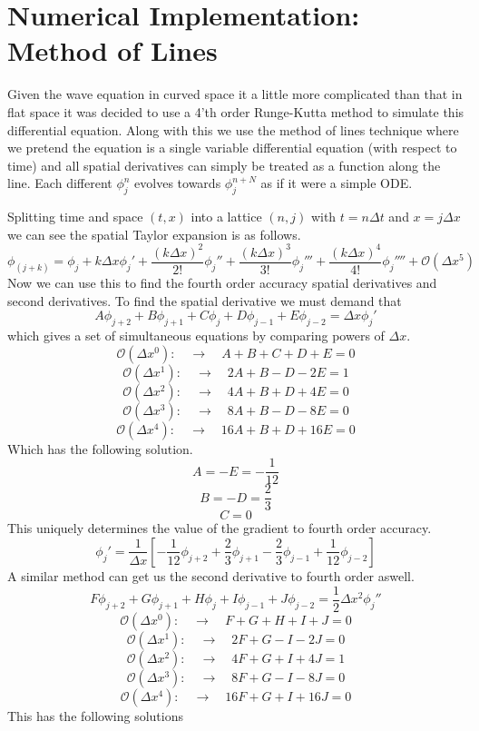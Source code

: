 \documentclass[11pt, oneside]{report}  %
\numberwithin{equation}{section}
\begin{document}
\section{Numerical Implementation: Method of Lines}
Given the wave equation in curved space it a little more complicated than that in flat space it was decided to use a 4'th order Runge-Kutta method to simulate this differential equation. Along with this we use the method of lines technique where we pretend the equation is a single variable differential equation (with respect to time) and all spatial derivatives can simply be treated as a function along the line. Each different $\phi^n_j$ evolves towards $\phi^{n+N}_j$ as if it were a simple ODE. 

Splitting time and space $(t,x)$ into a lattice $(n,j)$ with $t = n\Delta t$ and $x = j\Delta x$ we can see the spatial Taylor expansion is as follows.
$$ \phi_{(j+k)} = \phi_j + k\Delta x \phi_j' + \frac{(k\Delta x)^2}{2!}\phi_j'' + \frac{(k\Delta x)^3}{3!}\phi_j''' + \frac{(k\Delta x)^4}{4!}\phi_j'''' + \mathcal{O}(\Delta x^5)$$ 
Now we can use this to find the fourth order accuracy spatial derivatives and second derivatives. To find the spatial derivative we must demand that 
$$ A \phi_{j+2} +B \phi_{j+1} +C \phi_{j} +D \phi_{j-1} +E \phi_{j-2} = \Delta x \phi_j' $$
which gives a set of simultaneous equations by comparing powers of $\Delta x$. 
$$\mathcal{O}(\Delta x^0): \quad \rightarrow \quad  A+B+C+D+E=0$$
$$\mathcal{O}(\Delta x^1): \quad \rightarrow \quad   2A+B-D-2E=1$$
$$\mathcal{O}(\Delta x^2): \quad \rightarrow \quad   4A+B+D+4E=0$$
$$\mathcal{O}(\Delta x^3): \quad \rightarrow \quad   8A+B-D-8E=0$$
$$\mathcal{O}(\Delta x^4): \quad \rightarrow \quad   16A+B+D+16E=0$$
Which has the following solution. 
$$ A = -E = -\frac{1}{12}$$
 $$ B = -D = \frac{2}{3}$$
  $$C=0$$
This uniquely determines the value of the gradient to fourth order accuracy.
$$ \boxed{\phi_j' = \frac{1}{\Delta x}\left[-\frac{1}{12} \phi_{j+2} +\frac{2}{3} \phi_{j+1}  -\frac{2}{3} \phi_{j-1} +\frac{1}{12}\phi_{j-2}\right]}$$
A similar method can get us the second derivative to fourth order aswell.
$$F \phi_{j+2} +G \phi_{j+1} +H \phi_{j} +I \phi_{j-1} +J \phi_{j-2} = \frac{1}{2}\Delta x^2 \phi_j''  $$
$$\mathcal{O}(\Delta x^0): \quad \rightarrow \quad  F+G+H+I+J=0$$
$$\mathcal{O}(\Delta x^1): \quad \rightarrow \quad   2F+G-I-2J=0$$
$$\mathcal{O}(\Delta x^2): \quad \rightarrow \quad   4F+G+I+4J=1$$
$$\mathcal{O}(\Delta x^3): \quad \rightarrow \quad   8F+G-I-8J=0$$
$$\mathcal{O}(\Delta x^4): \quad \rightarrow \quad   16F+G+I+16J=0$$
This has the following solutions
\end{document}
